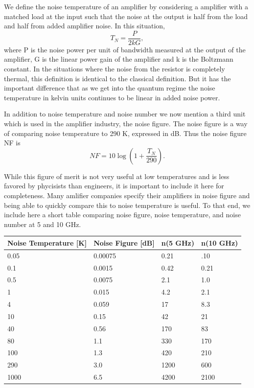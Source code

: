 \documentclass{report}
\begin{document}
	We define the noise temperature of an amplifier by considering a amplifier with a matched load at the input such that the noise at the output is half from the load and half from added amplifier noise.  In this situation, 
\begin{equation}
T_N = \frac{P}{2kG},
\end{equation}
	where P is the noise power per unit of bandwidth measured at the output of the amplifier, G is the linear power gain of the amplifier and k is the Boltzmann constant.   In the situations where the noise from the resistor is completely thermal, this definition is identical to the classical definition.  But it has the important difference that as we get into the quantum regime the noise temperature in kelvin units continues to be linear in added noise power.  

	In addition to noise temperature and noise number we now mention a third unit which is used in the amplifier industry, the noise figure.  The noise figure is a way of comparing noise temperature to 290 K, expressed in dB.  Thus the noise figure NF is 
\begin{equation}
NF = 10 \log{\left(1 + \frac{T_N}{290}\right)}.
\end{equation}

While this figure of merit is not very useful at low temperatures and is less favored by phycisists than engineers, it is important to include it here for completeness.  Many amlifier companies specify their amplifiers in noise figure and being able to quickly compare this to noise temperature is useful.  To that end, we include here a short table comparing noise figure, noise temperature, and noise number at 5 and 10 GHz.  

\begin{center}
    \begin{tabular}{ | l | l | l | l |}
    \hline
    Noise Temperature [K] & Noise Figure [dB] & n(5 GHz) & n(10 GHz) \\ \hline
    0.05 & 0.00075 & 0.21 & .10 \\ \hline
    0.1 & 0.0015 & 0.42 & 0.21 \\ \hline
    0.5 & 0.0075 & 2.1 & 1.0\\ \hline
    1 & 0.015 & 4.2 & 2.1\\ \hline
    4 & 0.059 & 17 & 8.3\\ \hline
    10 & 0.15 & 42 & 21\\ \hline
    40 & 0.56 & 170 & 83\\ \hline
    80 & 1.1 & 330 & 170\\ \hline    
    100 & 1.3 & 420 & 210\\ \hline
    290 & 3.0 & 1200 & 600\\ \hline
    1000 & 6.5 & 4200 & 2100\\ \hline

    \end{tabular}
\end{center}
	
\end{document}
